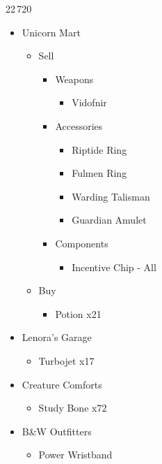 \documentclass{report}
\begin{document}

 



\begin{shop}{22\,720}
\begin{itemize}
    \item Unicorn Mart
    \begin{itemize}
        \item Sell
        \begin{itemize}
            \item Weapons
            \begin{itemize}
                \item Vidofnir
            \end{itemize}
            \item Accessories
            \begin{itemize}
                \item Riptide Ring
                \item Fulmen Ring
                \item Warding Talisman
                \item Guardian Amulet
            \end{itemize}
            \item Components
            \begin{itemize}
                \item Incentive Chip - All
            \end{itemize}
        \end{itemize}
        \item Buy
        \begin{itemize}
            \item Potion x21
        \end{itemize}
    \end{itemize}
    \item Lenora's Garage
    \begin{itemize}
        \item Turbojet x17
    \end{itemize}
    \item Creature Comforts
    \begin{itemize}
        \item Study Bone x72
    \end{itemize}
    \item B\&W Outfitters
    \begin{itemize}
        \item Power Wristband
    \end{itemize}
\end{itemize}
\end{shop}
\end{document}
